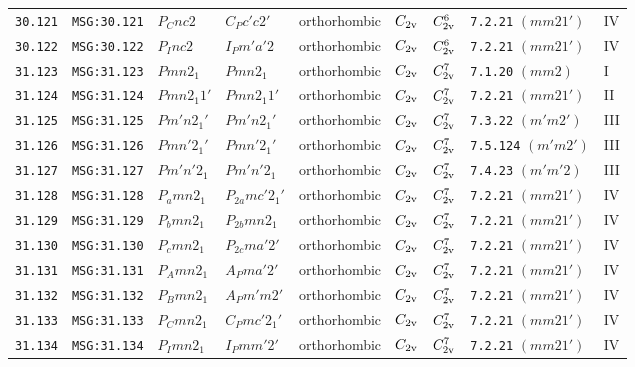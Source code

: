 \documentclass[fleqn,10pt]{jsarticle}
\begin{document}
\begin{center}
\begin{longtable}{lllllllll}
\texttt{30.121} & \texttt{MSG:30.121} & $P_{C}nc2$ & $C_{P}c'c2'$ & orthorhombic & $C_{\rm 2v}$ & $C_{\rm 2v}^{6}$ & \texttt{7.2.21} $(mm21')$ & IV \\
\texttt{30.122} & \texttt{MSG:30.122} & $P_{I}nc2$ & $I_{P}m'a'2$ & orthorhombic & $C_{\rm 2v}$ & $C_{\rm 2v}^{6}$ & \texttt{7.2.21} $(mm21')$ & IV \\ \hline
\texttt{31.123} & \texttt{MSG:31.123} & $Pmn2_{1}$ & $Pmn2_{1}$ & orthorhombic & $C_{\rm 2v}$ & $C_{\rm 2v}^{7}$ & \texttt{7.1.20} $(mm2)$ & I \\
\texttt{31.124} & \texttt{MSG:31.124} & $Pmn2_{1}1'$ & $Pmn2_{1}1'$ & orthorhombic & $C_{\rm 2v}$ & $C_{\rm 2v}^{7}$ & \texttt{7.2.21} $(mm21')$ & II \\
\texttt{31.125} & \texttt{MSG:31.125} & $Pm'n2_{1}'$ & $Pm'n2_{1}'$ & orthorhombic & $C_{\rm 2v}$ & $C_{\rm 2v}^{7}$ & \texttt{7.3.22} $(m'm2')$ & III \\
\texttt{31.126} & \texttt{MSG:31.126} & $Pmn'2_{1}'$ & $Pmn'2_{1}'$ & orthorhombic & $C_{\rm 2v}$ & $C_{\rm 2v}^{7}$ & \texttt{7.5.124} $(m'm2')$ & III \\
\texttt{31.127} & \texttt{MSG:31.127} & $Pm'n'2_{1}$ & $Pm'n'2_{1}$ & orthorhombic & $C_{\rm 2v}$ & $C_{\rm 2v}^{7}$ & \texttt{7.4.23} $(m'm'2)$ & III \\
\texttt{31.128} & \texttt{MSG:31.128} & $P_{a}mn2_{1}$ & $P_{2a}mc'2_{1}'$ & orthorhombic & $C_{\rm 2v}$ & $C_{\rm 2v}^{7}$ & \texttt{7.2.21} $(mm21')$ & IV \\
\texttt{31.129} & \texttt{MSG:31.129} & $P_{b}mn2_{1}$ & $P_{2b}mn2_{1}$ & orthorhombic & $C_{\rm 2v}$ & $C_{\rm 2v}^{7}$ & \texttt{7.2.21} $(mm21')$ & IV \\
\texttt{31.130} & \texttt{MSG:31.130} & $P_{c}mn2_{1}$ & $P_{2c}ma'2'$ & orthorhombic & $C_{\rm 2v}$ & $C_{\rm 2v}^{7}$ & \texttt{7.2.21} $(mm21')$ & IV \\
\texttt{31.131} & \texttt{MSG:31.131} & $P_{A}mn2_{1}$ & $A_{P}ma'2'$ & orthorhombic & $C_{\rm 2v}$ & $C_{\rm 2v}^{7}$ & \texttt{7.2.21} $(mm21')$ & IV \\
\texttt{31.132} & \texttt{MSG:31.132} & $P_{B}mn2_{1}$ & $A_{P}m'm2'$ & orthorhombic & $C_{\rm 2v}$ & $C_{\rm 2v}^{7}$ & \texttt{7.2.21} $(mm21')$ & IV \\
\texttt{31.133} & \texttt{MSG:31.133} & $P_{C}mn2_{1}$ & $C_{P}mc'2_{1}'$ & orthorhombic & $C_{\rm 2v}$ & $C_{\rm 2v}^{7}$ & \texttt{7.2.21} $(mm21')$ & IV \\
\texttt{31.134} & \texttt{MSG:31.134} & $P_{I}mn2_{1}$ & $I_{P}mm'2'$ & orthorhombic & $C_{\rm 2v}$ & $C_{\rm 2v}^{7}$ & \texttt{7.2.21} $(mm21')$ & IV \\ \hline

\end{longtable}
\end{center}
\end{document}
